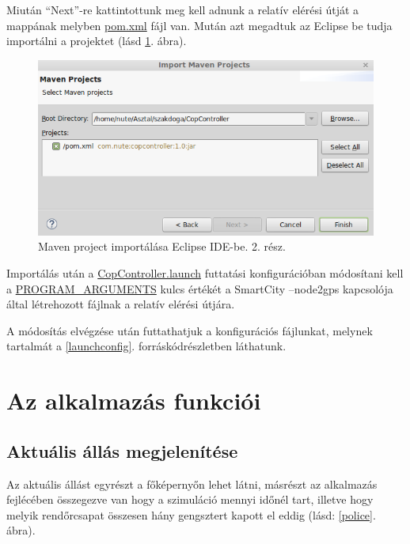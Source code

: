 \documentclass[a4paper,12pt]{report}
\begin{document}
\vspace{2mm}
Miután ``Next''-re kattintottunk meg kell adnunk a relatív elérési útját a mappának melyben \url{pom.xml} fájl van. Mután azt megadtuk az Eclipse be tudja importálni a projektet (lásd \ref{importmaven2}. ábra).

\begin{figure}[ht]
\centerline{
\includegraphics[width=6in]{img/importmavenproject2}}
\caption{Maven project importálása Eclipse IDE-be. 2. rész.}
\label{importmaven2}
\end{figure}

Importálás után a \url{CopController.launch} futtatási konfigurációban módosítani kell a \url{PROGRAM_ARGUMENTS} kulcs értékét a SmartCity --node2gps kapcsolója által létrehozott fájlnak a relatív elérési útjára.

\vspace{2mm}
A módosítás elvégzése után futtathatjuk a konfigurációs fájlunkat, melynek tartalmát a \ref{launchconfig}. forráskódrészletben láthatunk.



\section{Az alkalmazás funkciói}
\label{functions}

\subsection{Aktuális állás megjelenítése}
\label{actualstate}

Az aktuális állást egyrészt a főképernyőn lehet látni, másrészt az alkalmazás fejlécében összegezve van hogy a szimuláció mennyi időnél tart, illetve hogy melyik rendőrcsapat összesen hány gengsztert kapott el eddig (lásd: \ref{police}. ábra).
\end{document}
